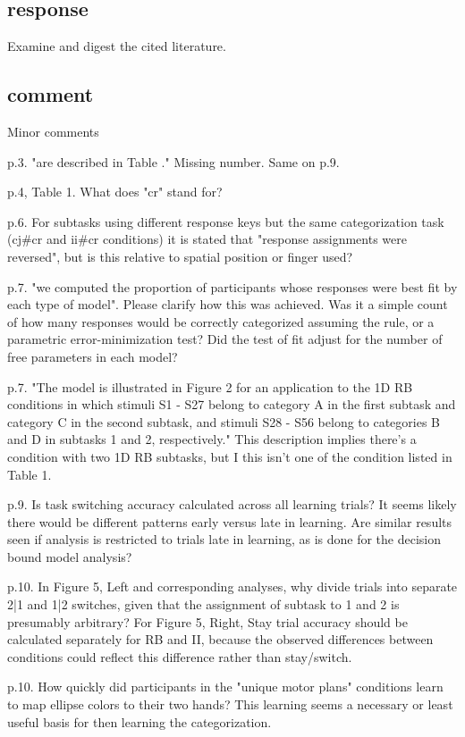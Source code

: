 \subsection{response}
Examine and digest the cited literature.

\subsection{comment}
Minor comments

p.3. "are described in Table ." Missing number. Same on p.9.

p.4, Table 1. What does "cr" stand for?

p.6. For subtasks using different response keys but the same
categorization task (cj#cr and ii#cr conditions) it is
stated that "response assignments were reversed", but is
this relative to spatial position or finger used?

p.7. "we computed the proportion of participants whose
responses were best fit by each type of model". Please
clarify how this was achieved. Was it a simple count of how
many responses would be correctly categorized assuming the
rule, or a parametric error-minimization test? Did the test
of fit adjust for the number of free parameters in each
model?

p.7. "The model is illustrated in Figure 2 for an
application to the 1D RB conditions in which stimuli S1 -
S27 belong to category A in the first subtask and category C
in the second subtask, and stimuli S28 - S56 belong to
categories B and D in subtasks 1 and 2, respectively." This
description implies there's a condition with two 1D RB
subtasks, but I this isn't one of the condition listed in
Table 1.

p.9. Is task switching accuracy calculated across all
learning trials? It seems likely there would be different
patterns early versus late in learning. Are similar results
seen if analysis is restricted to trials late in learning,
as is done for the decision bound model analysis?

p.10. In Figure 5, Left and corresponding analyses, why
divide trials into separate 2|1 and 1|2 switches, given that
the assignment of subtask to 1 and 2 is presumably
arbitrary? For Figure 5, Right, Stay trial accuracy should
be calculated separately for RB and II, because the observed
differences between conditions could reflect this difference
rather than stay/switch.

p.10. How quickly did participants in the "unique motor
plans" conditions learn to map ellipse colors to their two
hands? This learning seems a necessary or least useful basis
for then learning the categorization.

